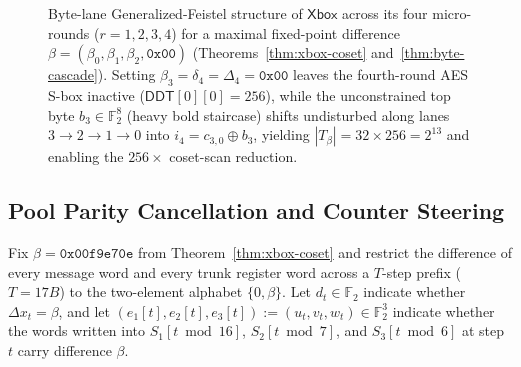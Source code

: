 \documentclass[11pt,a4paper]{article}
\theoremstyle{definition}
\theoremstyle{remark}
\newcommand{\Ftwo}{\mathbb{F}_2}
\newcommand{\Xbox}{\mathsf{Xbox}}
\begin{document}
\begin{figure}[t!]
\caption{Byte-lane Generalized-Feistel structure of $\Xbox$ across its four micro-rounds ($r = 1, 2, 3, 4$) for a maximal fixed-point difference $\beta = (\beta_0, \beta_1, \beta_2, \mathtt{0x00})$ (Theorems~\ref{thm:xbox-coset} and~\ref{thm:byte-cascade}). Setting $\beta_3 = \delta_4 = \Delta_4 = \mathtt{0x00}$ leaves the fourth-round AES S-box inactive ($\mathsf{DDT}[0][0] = 256$), while the unconstrained top byte $b_3 \in \Ftwo^8$ (heavy bold staircase) shifts undisturbed along lanes $3 \to 2 \to 1 \to 0$ into $i_4 = c_{3,0} \oplus b_3$, yielding $|T_\beta| = 32 \times 256 = 2^{13}$ and enabling the $256\times$ coset-scan reduction.}
\label{fig:xbox-trail}
\end{figure}

\subsection{Pool Parity Cancellation and Counter Steering}
\label{subsec:pattern-counter}

Fix $\beta = \mathtt{0x00f9e70e}$ from Theorem~\ref{thm:xbox-coset} and restrict the difference of every message word and every trunk register word across a $T$-step prefix ($T = 17 B$) to the two-element alphabet $\{0, \beta\}$. Let $d_t \in \Ftwo$ indicate whether $\Delta x_t = \beta$, and let $(e_1[t], e_2[t], e_3[t]) := (u_t, v_t, w_t) \in \Ftwo^3$ indicate whether the words written into $S_1[t \bmod 16]$, $S_2[t \bmod 7]$, and $S_3[t \bmod 6]$ at step $t$ carry difference $\beta$.
\end{document}
